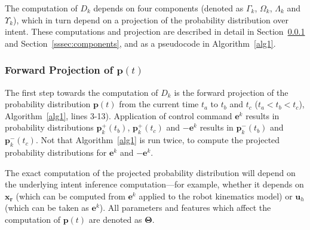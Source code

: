 The computation of $D_k$ depends on four components (denoted as $\Gamma_k$, $\Omega_k$, $\Lambda_k$ and $\Upsilon_k$), which in turn depend on a projection of the probability distribution over intent. These computations and projection are described in detail in Section~\ref{sssec:projection} and Section~\ref{sssec:components}, and as a pseudocode in Algorithm~\ref{alg1}. 

\subsubsection{Forward Projection of $\boldsymbol{p}(t)$}\label{sssec:projection}
The first step towards the computation of $D_k$ is the forward projection of the probability distribution $\boldsymbol{p}(t)$ from the current time $t_a$ to $t_b$ and $t_c$ ($t_a < t_b < t_c$), Algorithm~\ref{alg1}, lines 3-13). Application of control command $\boldsymbol{e}^k$ results in probability distributions $\boldsymbol{p}^+_k(t_b)$, $\boldsymbol{p}^+_k(t_c)$ and $-\boldsymbol{e}^k$ results in $\boldsymbol{p}^-_k(t_b)$ and $\boldsymbol{p}^-_k(t_c)$. Not that Algorithm~\ref{alg1} is run twice, to compute the projected probability distributions for $\boldsymbol{e}^k$ and $-\boldsymbol{e}^k$.

 The exact computation of the projected probability distribution will depend on the underlying intent inference computation---for example, whether it depends on $\boldsymbol{x_r}$ (which can be computed from $\boldsymbol{e}^k$ applied to the robot kinematics model) or $\boldsymbol{u}_h$ (which can be taken as $\boldsymbol{e}^k$). All parameters and features which affect the computation of $\boldsymbol{p}(t)$ are denoted as $\boldsymbol{\Theta}$. 

